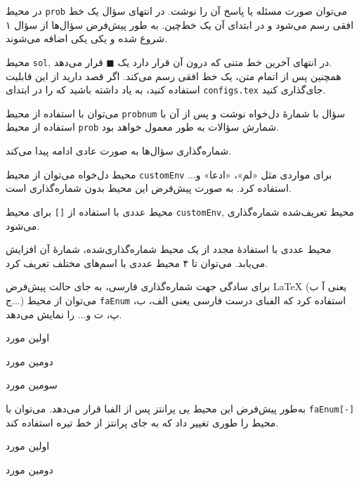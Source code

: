 \begin{prob}
	در محیط
	\texttt{prob}
	می‌توان صورت مسئله یا پاسخ آن را نوشت.  در انتهای سؤال یک خط افقی رسم می‌شود و در ابتدای آن یک خط‌چین. به طور پیش‌فرض سؤال‌ها از سؤال ۱ شروع شده و یکی یکی اضافه می‌شوند.
	
\end{prob}
\begin{sol}
	محیط
	\texttt{sol},
	در انتهای آخرین خط متنی که درون آن قرار دارد یک 
	$ \blacksquare $
	قرار می‌دهد.\\	
	همچنین پس از اتمام متن، یک خط افقی رسم می‌کند. اگر قصد دارید از این قابلیت استفاده کنید، به یاد داشته باشید که 
	را در ابتدای 
	\texttt{configs.tex}
	جای‌گذاری کنید.
\end{sol}
\begin{probnum}{10}
	می‌توان با استفاده از محیط
	\texttt{probnum}
	سؤال با شمارهٔ دل‌خواه نوشت و پس از آن با استفاده از محیط 
	\texttt{prob}
	شمارش سؤالات به طور معمول خواهد بود.
	
\end{probnum}
\begin{prob}
	شماره‌گذاری سؤال‌ها به صورت عادی ادامه پیدا می‌کند.
	
\end{prob}
\begin{sol}
	
	\begin{customEnv}{محیط دل‌خواه}
		می‌توان از محیط
		\texttt{customEnv}
		برای مواردی مثل «لم»، «ادعا» و... استفاده کرد. به صورت پیش‌فرض این محیط بدون شماره‌گذاری است.
	\end{customEnv}
	\begin{customEnv}[]{محیط عددی}
		با استفاده از
		\texttt{[]}
		برای محیط
		\texttt{customEnv},
		محیط تعریف‌شده شماره‌گذاری می‌شود.
	\end{customEnv}
	\begin{customEnv}[]{محیط عددی}
		با استفادهٔ مجدد از یک محیط شماره‌گذاری‌شده، شمارهٔ آن افزایش می‌یابد. ‌می‌توان تا ۴ محیط عددی با اسم‌های مختلف تعریف کرد.
	\end{customEnv}
	برای سادگی جهت شماره‌گذاری فارسی، به جای حالت پیش‌فرض
	\LaTeX
	(یعنی آ ب ج...) می‌توان از محیط
	\texttt{faEnum}
	استفاده کرد که الفبای درست فارسی یعنی الف، ب، پ، ت و... را نمایش می‌دهد.
	\begin{faEnum}
		\item اولین مورد
		\item دومین مورد
		\item سومین مورد
	\end{faEnum}
	به‌طور پیش‌فرض این محیط یی پرانتز پس از الفبا قرار می‌دهد. می‌توان با
	\texttt{faEnum[-]}
	محیط را طوری تغییر داد که به جای پرانتز از خط تیره استفاده کند.
	\begin{faEnum}[-]
		\item اولین مورد
		\item دومین مورد
	\end{faEnum}
\end{sol}

